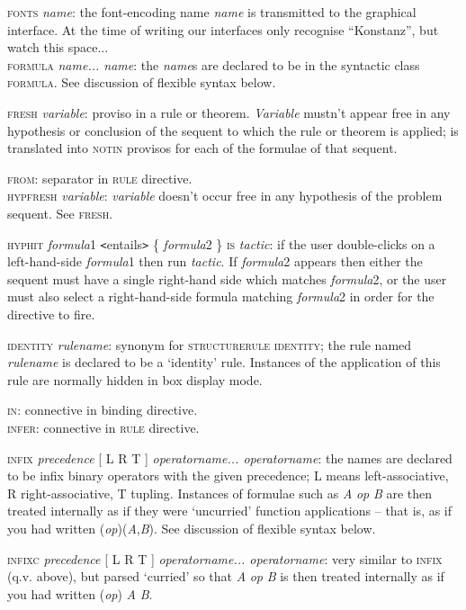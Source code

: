 \documentclass[11pt]{book}
\begin{document}
\textsc{fonts} \textit{name}: the font-encoding name \textit{name} is transmitted to the graphical interface. At the time of writing our interfaces only recognise ``Konstanz'', but watch this space...\\
\textsc{formula} \textit{name... name}: the \textit{name}s are declared to be in the syntactic class \textsc{formula}. See discussion of flexible syntax below.


\textsc{fresh} \textit{variable}: proviso in a rule or theorem. \textit{Variable} mustn't appear free in any hypothesis or conclusion of the sequent to which the rule or theorem is applied; is translated into \textsc{notin} provisos for each of the formulae of that sequent.


\textsc{from}: separator in \textsc{rule} directive.\\
\textsc{hypfresh} \textit{variable}: \textit{variable} doesn't occur free in any hypothesis of the problem sequent. See \textsc{fresh.}


\textsc{hyphit} \textit{formula}1 \texttt{<}entails\texttt{>} \{ \textit{formula}2 \} \textsc{is} \textit{tactic}: if the user double-clicks on a left-hand-side \textit{formula}1 then run \textit{tactic}. If \textit{formula}2 appears then either the sequent must have a single right-hand side which matches \textit{formula}2, or the user must also select a right-hand-side formula matching \textit{formula}2 in order for the directive to fire.


\textsc{identity} \textit{rulename}: synonym for \textsc{structurerule} \textsc{identity}; the rule named \textit{rulename} is declared to be a `identity' rule. Instances of the application of this rule are normally hidden in box display mode.


\textsc{in}: connective in binding directive.\\
\textsc{infer}: connective in \textsc{rule} directive.


\textsc{infix} \textit{precedence} [ L {\textbar} R {\textbar} T ] \textit{operatorname... operatorname}: the names are declared to be infix binary operators with the given precedence; L means left-associative, R right-associative, T tupling. Instances of formulae such as \textit{A} \textit{op} \textit{B} are then treated internally as if they were `uncurried' function applications -- that is, as if you had written (\textit{op})(\textit{A},\textit{B}). See discussion of flexible syntax below.


\textsc{infixc} \textit{precedence} [ L {\textbar} R {\textbar} T ] \textit{operatorname... operatorname}: very similar to \textsc{infix} (q.v. above), but parsed `curried' so that \textit{A} \textit{op} \textit{B} is then treated internally as if you had written (\textit{op}) \textit{A} \textit{B}.
\end{document}
